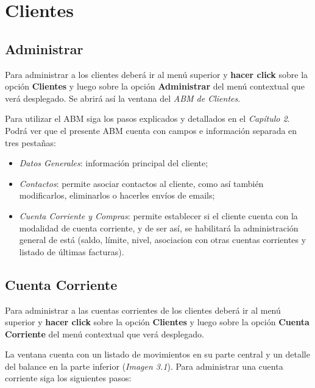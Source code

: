 \documentclass{book}
\begin{document}
%
%
\chapter{Clientes}


\section{Administrar}

Para administrar a los clientes deberá ir al menú superior y \textbf{hacer click} sobre la opción \textbf{Clientes} y luego sobre la opción \textbf{Administrar} del menú contextual que verá desplegado. Se abrirá así la ventana del \textit{ABM de Clientes}. 
\par
Para utilizar el ABM siga los pasos explicados y detallados en el \textit{Capítulo 2}. Podrá ver que el presente ABM cuenta con campos e información separada en tres pestañas:
\smallskip

\begin{itemize}
	\renewcommand{\labelitemi}{\scriptsize\tiny$\blacksquare$} 
	\itemsep=5pt \topsep=0pt \partopsep=0pt \parskip=0pt \parsep=0pt
	
	\item \textit{Datos Generales}: información principal del cliente;

	\item \textit{Contactos}: permite asociar contactos al cliente, como así también modificarlos, eliminarlos o hacerles envíos de emails;

	\item \textit{Cuenta Corriente y Compras}: permite establecer si el cliente cuenta con la modalidad de cuenta corriente, y de ser así, se habilitará la administración general de está (saldo, límite, nivel, asociacion con otras cuentas corrientes y listado de últimas facturas).

\end{itemize}
\medskip


\section{Cuenta Corriente}

Para administrar a las cuentas corrientes de los clientes deberá ir al menú superior y \textbf{hacer click} sobre la opción \textbf{Clientes} y luego sobre la opción \textbf{Cuenta Corriente} del menú contextual que verá desplegado. 
\par
La ventana cuenta con un listado de movimientos en su parte central y un detalle del balance en la parte inferior (\textit{Imagen 3.1}). Para administrar una cuenta corriente siga los siguientes pasos:
\end{document}
